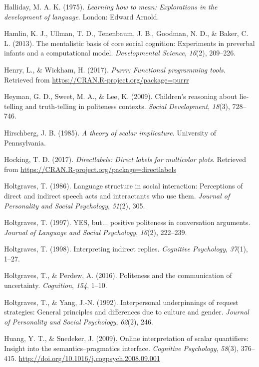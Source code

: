 \documentclass[oneside]{report}
\begin{document}
\hypertarget{ref-halliday1975}{}
Halliday, M. A. K. (1975). \emph{Learning how to mean: Explorations in
the development of language}. London: Edward Arnold.

\hypertarget{ref-hamlin2013mentalistic}{}
Hamlin, K. J., Ullman, T. D., Tenenbaum, J. B., Goodman, N. D., \&
Baker, C. L. (2013). The mentalistic basis of core social cognition:
Experiments in preverbal infants and a computational model.
\emph{Developmental Science}, \emph{16}(2), 209--226.

\hypertarget{ref-R-purrr}{}
Henry, L., \& Wickham, H. (2017). \emph{Purrr: Functional programming
tools}. Retrieved from \url{https://CRAN.R-project.org/package=purrr}

\hypertarget{ref-heyman2009}{}
Heyman, G. D., Sweet, M. A., \& Lee, K. (2009). Children's reasoning
about lie-telling and truth-telling in politeness contexts. \emph{Social
Development}, \emph{18}(3), 728--746.

\hypertarget{ref-hirschberg1985}{}
Hirschberg, J. B. (1985). \emph{A theory of scalar implicature}.
University of Pennsylvania.

\hypertarget{ref-R-directlabels}{}
Hocking, T. D. (2017). \emph{Directlabels: Direct labels for multicolor
plots}. Retrieved from
\url{https://CRAN.R-project.org/package=directlabels}

\hypertarget{ref-holtgraves1986}{}
Holtgraves, T. (1986). Language structure in social interaction:
Perceptions of direct and indirect speech acts and interactants who use
them. \emph{Journal of Personality and Social Psychology}, \emph{51}(2),
305.

\hypertarget{ref-holtgraves1997}{}
Holtgraves, T. (1997). YES, but... positive politeness in conversation
arguments. \emph{Journal of Language and Social Psychology},
\emph{16}(2), 222--239.

\hypertarget{ref-holtgraves1998}{}
Holtgraves, T. (1998). Interpreting indirect replies. \emph{Cognitive
Psychology}, \emph{37}(1), 1--27.

\hypertarget{ref-holtgraves2016}{}
Holtgraves, T., \& Perdew, A. (2016). Politeness and the communication
of uncertainty. \emph{Cognition}, \emph{154}, 1--10.

\hypertarget{ref-holtgraves1992}{}
Holtgraves, T., \& Yang, J.-N. (1992). Interpersonal underpinnings of
request strategies: General principles and differences due to culture
and gender. \emph{Journal of Personality and Social Psychology},
\emph{62}(2), 246.

\hypertarget{ref-huang2009a}{}
Huang, Y. T., \& Snedeker, J. (2009). Online interpretation of scalar
quantifiers: Insight into the semantics--pragmatics interface.
\emph{Cognitive Psychology}, \emph{58}(3), 376--415.
\url{http://doi.org/10.1016/j.cogpsych.2008.09.001}
\end{document}
